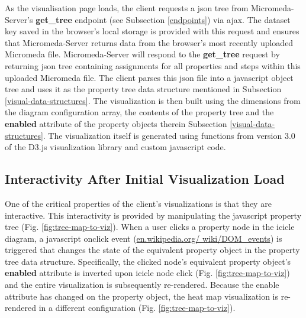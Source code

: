 As the visualisation page loads, the client requests a \gls{json} tree from 
Micromeda-Server's \textbf{get\_tree} endpoint (see Subsection \ref{endpoints}) 
via \gls{ajax}. The dataset key saved in the browser's local storage is provided 
with this request and ensures that Micromeda-Server returns data from the 
browser's most recently uploaded Micromeda file. Micromeda-Server will respond 
to the \textbf{get\_tree} request by returning \gls{json} tree containing 
assignments for all properties and steps within this uploaded Micromeda file. 
The client parses this \gls{json} file into a \gls{javascript} object tree and 
uses it as the property tree data structure mentioned in Subsection 
\ref{visual-data-structures}. The visualization is then built using the 
dimensions from the diagram configuration array, the contents of the property 
tree and the \textbf{enabled} attribute of the property objects therein 
Subsection \ref{visual-data-structures}. The visualization itself is generated 
using functions from version 3.0 of the D3.js visualization library 
\cite{bostock2015d3} and custom \gls{javascript} code.

\subsection{Interactivity After Initial Visualization Load}

One of the critical properties of the client's visualizations is that they are 
interactive. This interactivity is provided by manipulating the \gls{javascript} 
property tree (Fig. \ref{fig:tree-map-to-viz}). When a user clicks a property 
node in the icicle diagram, a \gls{javascript} onclick event \cite{dom-events} 
(\href{http://en.wikipedia.org/wiki/DOM_events}{en.wikipedia.org/ 
wiki/DOM\_events}) is triggered that changes the state of the equivalent 
property object in the property tree data structure. Specifically, the clicked 
node's equivalent property object's \textbf{enabled} attribute is inverted upon 
icicle node click (Fig. \ref{fig:tree-map-to-viz}) and the entire visualization 
is subsequently re-rendered. Because the enable attribute has changed on the 
property object, the heat map visualization is re-rendered in a different 
configuration (Fig. \ref{fig:tree-map-to-viz}). 

